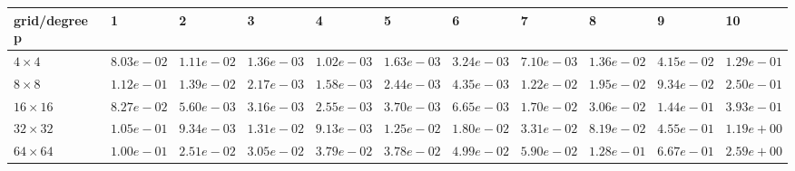 \begin{tabular}{lllllllllll}
\hline
 grid/degree p   & 1          & 2          & 3          & 4          & 5          & 6          & 7          & 8          & 9          & 10         \\
\hline
 $4 \times 4$    & $8.03e-02$ & $1.11e-02$ & $1.36e-03$ & $1.02e-03$ & $1.63e-03$ & $3.24e-03$ & $7.10e-03$ & $1.36e-02$ & $4.15e-02$ & $1.29e-01$ \\
 $8 \times 8$    & $1.12e-01$ & $1.39e-02$ & $2.17e-03$ & $1.58e-03$ & $2.44e-03$ & $4.35e-03$ & $1.22e-02$ & $1.95e-02$ & $9.34e-02$ & $2.50e-01$ \\
 $16 \times 16$  & $8.27e-02$ & $5.60e-03$ & $3.16e-03$ & $2.55e-03$ & $3.70e-03$ & $6.65e-03$ & $1.70e-02$ & $3.06e-02$ & $1.44e-01$ & $3.93e-01$ \\
 $32 \times 32$  & $1.05e-01$ & $9.34e-03$ & $1.31e-02$ & $9.13e-03$ & $1.25e-02$ & $1.80e-02$ & $3.31e-02$ & $8.19e-02$ & $4.55e-01$ & $1.19e+00$ \\
 $64 \times 64$  & $1.00e-01$ & $2.51e-02$ & $3.05e-02$ & $3.79e-02$ & $3.78e-02$ & $4.99e-02$ & $5.90e-02$ & $1.28e-01$ & $6.67e-01$ & $2.59e+00$ \\
\hline
\end{tabular}